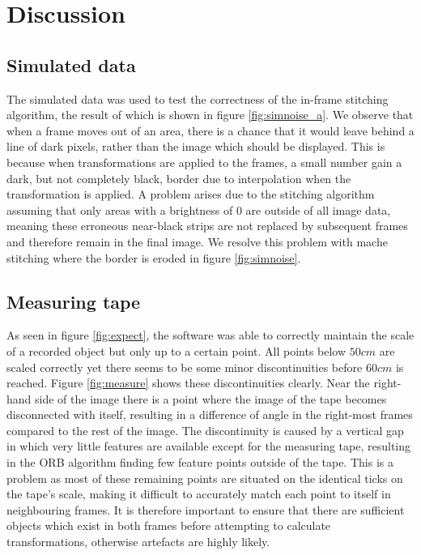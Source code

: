 \section{Discussion}
\subsection{Simulated data}
The simulated data was used to test the correctness of the in-frame stitching algorithm,
the result of which is shown in figure \ref{fig:simnoise_a}.
We observe that when a frame moves out of an area,
there is a chance that it would leave behind a line of dark pixels, rather than the image which should be displayed.
This is because when transformations are applied to the frames, a small number gain a dark, but not completely black, border due to interpolation when the transformation is applied.
A problem arises due to the stitching algorithm assuming that only areas with a brightness of 0 are outside of all image data, 
meaning these erroneous near-black strips are not replaced by subsequent frames and therefore remain in the final image. 
We resolve this problem with mache stitching where the border is eroded in figure \ref{fig:simnoise}.


\subsection{Measuring tape}

As seen in figure \ref{fig:expect},
the software was able to correctly maintain the scale of a recorded object but only up to a certain point.
All points below $50 cm$ are scaled correctly
yet there seems to be some minor discontinuities before $60cm$ is reached.
Figure \ref{fig:measure} shows these discontinuities clearly.
Near the right-hand side of the image there is a point where the image of the tape becomes disconnected with itself,
resulting in a difference of angle in the right-most frames compared to the rest of the image.
The discontinuity is caused by a vertical gap in which very little features are available except for the measuring tape,
resulting in the ORB algorithm finding few feature points outside of the tape.
This is a problem as most of these remaining points are situated on the identical ticks on the tape's scale,
making it difficult to accurately match each point to itself in neighbouring frames.
It is therefore important to ensure that there are sufficient objects which exist in both frames before attempting to calculate transformations,  otherwise artefacts are highly likely.

